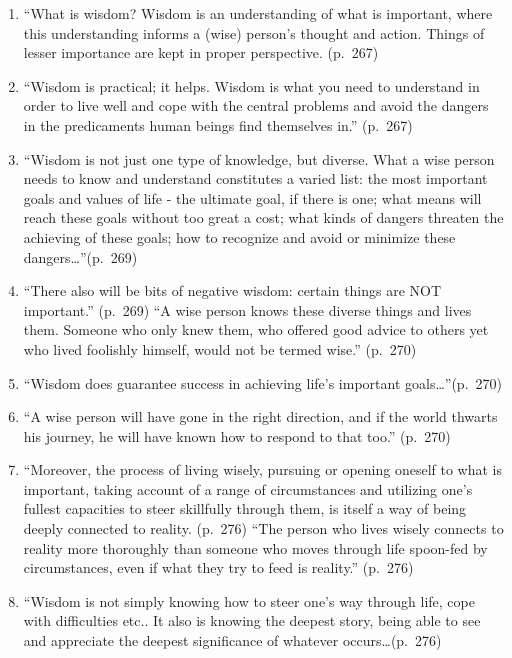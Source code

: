 \documentclass[
]{book}
\providecommand{\tightlist}{%
  \setlength{\itemsep}{0pt}\setlength{\parskip}{0pt}}
\begin{document}
\begin{enumerate}
\def\labelenumi{\arabic{enumi}.}
\tightlist
\item
  ``What is wisdom? Wisdom is an understanding of what is important, where this understanding informs a (wise) person's thought and action. Things of lesser importance are kept in proper perspective. (p.~267)\\
\item
  ``Wisdom is practical; it helps. Wisdom is what you need to understand in order to live well and cope with the central problems and avoid the dangers in the predicaments human beings find themselves in.'' (p.~267)\\
\item
  ``Wisdom is not just one type of knowledge, but diverse. What a wise person needs to know and understand constitutes a varied list: the most important goals and values of life - the ultimate goal, if there is one; what means will reach these goals without too great a cost; what kinds of dangers threaten the achieving of these goals; how to recognize and avoid or minimize these dangers\ldots{}''(p.~269)\\
\item
  ``There also will be bits of negative wisdom: certain things are NOT important.'' (p.~269) ``A wise person knows these diverse things and lives them. Someone who only knew them, who offered good advice to others yet who lived foolishly himself, would not be termed wise.'' (p.~270)\\
\item
  ``Wisdom does guarantee success in achieving life's important goals\ldots{}''(p.~270)\\
\item
  ``A wise person will have gone in the right direction, and if the world thwarts his journey, he will have known how to respond to that too.'' (p.~270)\\
\item
  ``Moreover, the process of living wisely, pursuing or opening oneself to what is important, taking account of a range of circumstances and utilizing one's fullest capacities to steer skillfully through them, is itself a way of being deeply connected to reality. (p.~276) ``The person who lives wisely connects to reality more thoroughly than someone who moves through life spoon-fed by circumstances, even if what they try to feed is reality.'' (p.~276)\\
\item
  ``Wisdom is not simply knowing how to steer one's way through life, cope with difficulties etc.. It also is knowing the deepest story, being able to see and appreciate the deepest significance of whatever occurs\ldots(p.~276)
\end{enumerate}
\end{document}
